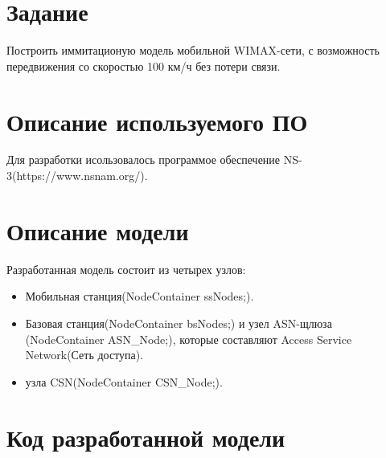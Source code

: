 \documentclass[14pt,a4paper]{article}
\begin{document}
\section{Задание}
Построить иммитационую модель мобильной WIMAX-сети, с возможность передвижения
со скоростью 100 км/ч без потери связи.

\section{Описание используемого ПО}
Для разработки исользовалось программое обеспечение
NS-3(https://www.nsnam.org/).

\section{Описание модели}
Разработанная модель состоит из четырех узлов:
\begin{itemize}
  \item{} Мобильная станция(NodeContainer ssNodes;).
  \item{} Базовая станция(NodeContainer bsNodes;) и узел ASN-щлюза
  (NodeContainer ASN\_Node;), которые составляют Access Service Network(Сеть
  доступа).
  \item{} узла CSN(NodeContainer CSN\_Node;).
\end{itemize}



\section{Код разработанной модели}
\end{document}
